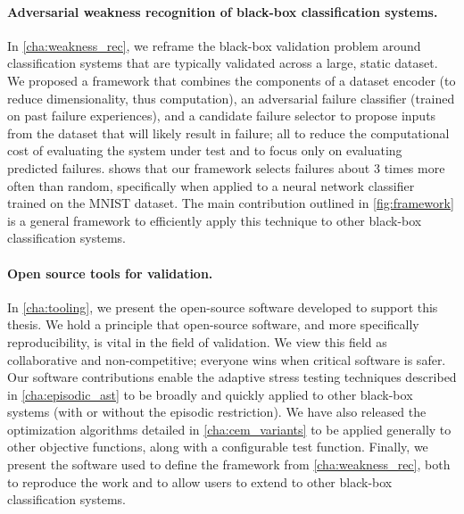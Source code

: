 \paragraph{Adversarial weakness recognition of black-box classification systems.}
In \cref{cha:weakness_rec}, we reframe the black-box validation problem around classification systems that are typically validated across a large, static dataset.
We proposed a framework that combines the components of a dataset encoder (to reduce dimensionality, thus computation), an adversarial failure classifier (trained on past failure experiences), and a candidate failure selector to propose inputs from the dataset that will likely result in failure; all to reduce the computational cost of evaluating the system under test and to focus only on evaluating predicted failures.
 shows that our framework selects failures about 3 times more often than random, specifically when applied to a neural network classifier trained on the MNIST dataset.
The main contribution outlined in \cref{fig:framework} is a general framework to efficiently apply this technique to other black-box classification systems.

\paragraph{Open source tools for validation.}
In \cref{cha:tooling}, we present the open-source software developed to support this thesis.
We hold a principle that open-source software, and more specifically reproducibility, is vital in the field of validation.
We view this field as collaborative and non-competitive; everyone wins when critical software is safer.
Our software contributions enable the adaptive stress testing techniques described in \cref{cha:episodic_ast} to be broadly and quickly applied to other black-box systems (with or without the episodic restriction).
We have also released the optimization algorithms detailed in \cref{cha:cem_variants} to be applied generally to other objective functions, along with a configurable test function.
Finally, we present the software used to define the framework from \cref{cha:weakness_rec}, both to reproduce the work and to allow users to extend to other black-box classification systems.


